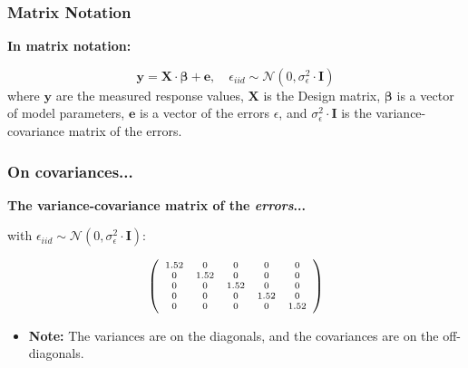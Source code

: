 \documentclass{beamer}
\begin{document}
\begin{frame}
  \frametitle{Matrix Notation}
  \textbf{In matrix notation:}
  
  \begin{equation*}
  \mathbf{y} = \mathbf{X} \cdot \mathbf{\beta} + \mathbf{e}, \quad \epsilon_{iid} \sim \mathcal{N}(0, \sigma^2_{\epsilon} \cdot \mathbf{I})
  \end{equation*}
  where $\mathbf{y}$ are the measured response values, $\mathbf{X}$ is the Design matrix, $\mathbf{\beta}$ is a vector of model parameters, $\mathbf{e}$ is a vector of the errors $\epsilon$, and $\sigma^2_{\epsilon} \cdot \mathbf{I}$ is the variance-covariance matrix of the errors.
\end{frame}

\begin{frame}
  \frametitle{On covariances...}
  \textbf{The variance-covariance matrix of the \textit{errors}...}

  with $\epsilon_{iid} \sim \mathcal{N}(0, \sigma^2_{\epsilon} \cdot \mathbf{I})$:
  \vspace{0.5cm}
  
  \begin{equation*}
  \scriptsize{\left( \begin{array}{ccccc} 1.52 & 0 & 0 & 0 & 0 \\ 0 & 1.52 & 0 & 0 & 0 \\ 0 & 0 & 1.52 & 0 & 0 \\ 0 & 0 & 0 & 1.52 & 0 \\ 0 & 0 & 0 & 0 & 1.52 \end{array}\right)}
  \end{equation*}
 \vspace{0.5cm}
 
  \begin{itemize}
    \item \textbf{Note:} The variances are on the diagonals, and the covariances are on the off-diagonals.
  \end{itemize}
\end{frame}
\end{document}
